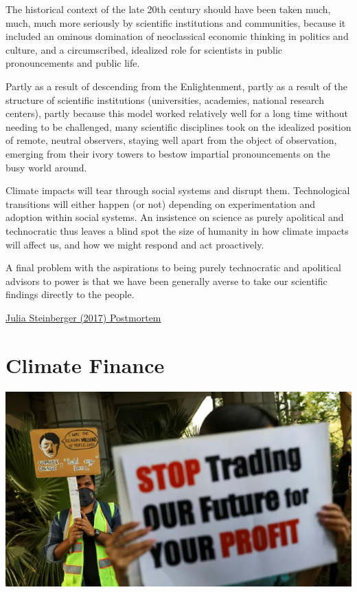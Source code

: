 \documentclass[
]{book}
\begin{document}
The historical context of the late 20th century should have been taken much, much, much more seriously by scientific institutions and communities, because it included an ominous domination of neoclassical economic thinking in politics and culture, and a circumscribed, idealized role for scientists in public pronouncements and public life.

Partly as a result of descending from the Enlightenment, partly as a result of the structure of scientific institutions (universities, academies, national research centers), partly because this model worked relatively well for a long time without needing to be challenged, many scientific disciplines took on the idealized position of remote, neutral observers, staying well apart from the object of observation, emerging from their ivory towers to bestow impartial pronouncements on the busy world around.

Climate impacts will tear through social systems and disrupt them. Technological transitions will either happen (or not) depending on experimentation and adoption within social systems. An insistence on science as purely apolitical and technocratic thus leaves a blind spot the size of humanity in how climate impacts will affect us, and how we might respond and act proactively.

A final problem with the aspirations to being purely technocratic and apolitical advisors to power is that we have been generally averse to take our scientific findings directly to the people.

\href{https://medium.com/age-of-awareness/a-postmortem-for-survival-on-science-failure-and-action-on-climate-change-35636c79971e}{Julia Steinberger (2017) Postmortem}

\hypertarget{climate-finance}{%
\chapter{Climate Finance}\label{climate-finance}}

\includegraphics{fig/trading_future4profits.png}
\end{document}
